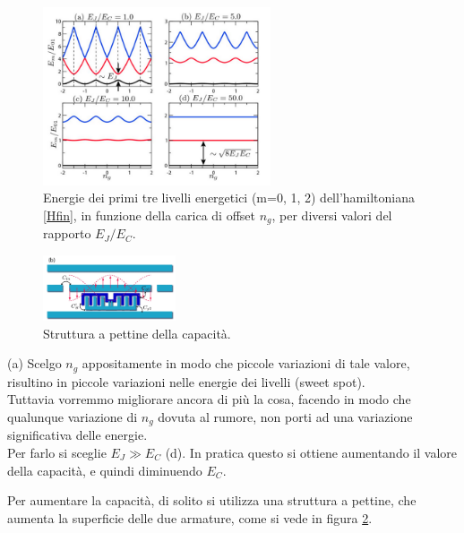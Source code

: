\documentclass[10pt,a4paper]{article}
\begin{document}
\begin{figure}[h]
    \centering
    \includegraphics[width=0.6\textwidth]{EJEC.png}
    \caption{Energie dei primi tre livelli energetici (m=0, 1, 2) dell'hamiltoniana \eqref{Hfin}, in funzione della carica di offset $n_g$, per diversi valori del rapporto $E_J/E_C$.}
    \label{ejec}
\end{figure}
\FloatBarrier


\begin{figure}
  \begin{center}
        \includegraphics[width=0.35\textwidth]{trasmon2.png}
  \end{center}
  \caption{Struttura a pettine della capacità. \label{pettine}}
\end{figure}


(a) Scelgo $n_g$ appositamente in modo che piccole variazioni di tale valore, risultino in piccole variazioni nelle energie dei livelli (sweet spot).\\ 
Tuttavia vorremmo migliorare ancora di più la cosa, facendo in modo che qualunque variazione di $n_g$ dovuta al rumore, non porti ad una variazione significativa delle energie.\\
Per farlo si sceglie $E_J \gg E_C$ (d). In pratica questo si ottiene aumentando il valore della capacità,  e quindi diminuendo $E_C$.

Per aumentare la capacità, di solito si utilizza una struttura a pettine, che aumenta la superficie delle due armature, come si vede in figura \ref{pettine}.

\end{document}
